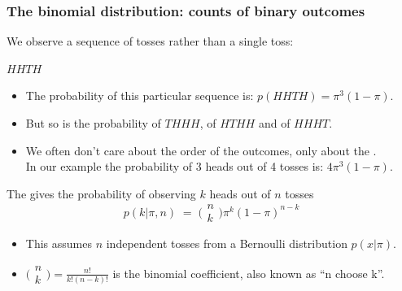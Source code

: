 \begin{frame}
\frametitle{The binomial distribution: counts of binary outcomes}

We observe a sequence of tosses rather than a single toss:
\centerline{$HHTH$}

\begin{itemize}
\item The probability of this particular sequence is:\; $p(HHTH)=\pi^3(1-\pi)$.
\item But so is the probability of $THHH$, of $HTHH$ and of $HHHT$.
\item We often don't care about the order of the outcomes, only about the .\\
In our example the probability of 3 heads out of 4 tosses is:\; $4\pi^3(1-\pi)$.
\end{itemize}

The  gives the probability of
observing $k$ heads out of $n$ tosses
\[
p(k|\pi,n)\;=\; 
\big(\!\!\begin{array}{c}n\\k\end{array}\!\!\big)\pi^k(1-\pi)^{n-k}
\]
\begin{itemize}
\item This assumes $n$ independent tosses from a Bernoulli distribution $p(x|\pi)$.
\item $\big(\!\!\begin{array}{c}n\\k\end{array}\!\!\big)=\frac{n!}{k!(n-k)!}$ is the 
binomial coefficient, also known as ``n choose k''.
\end{itemize}

\end{frame}



